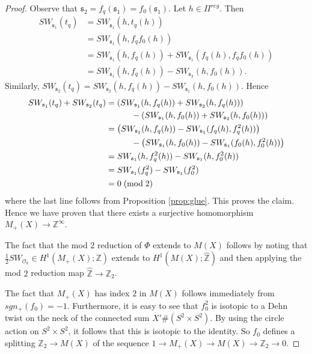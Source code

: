 \documentclass{amsart}
\theoremstyle{definition}
\theoremstyle{remark}
\numberwithin{equation}{section}
\begin{document}
\begin{proof}
Observe that $\mathfrak{s}_2 = f_q(\mathfrak{s}_1) = f_0(\mathfrak{s}_1)$. Let $h \in \Pi^{reg}$. Then
\begin{align*}
SW_{\mathfrak{s}_1}(t_q) &= SW_{\mathfrak{s}_1}( h , t_q(h) ) \\
&= SW_{\mathfrak{s}_1}(h , f_q f_0(h) ) \\
&= SW_{\mathfrak{s}_1}(h , f_q(h) ) + SW_{\mathfrak{s}_1}( f_q(h) , f_q f_0(h) ) \\
&= SW_{\mathfrak{s}_1}(h , f_q(h) ) - SW_{\mathfrak{s}_2}( h , f_0(h)).
\end{align*}
Similarly, $SW_{\mathfrak{s}_2}(t_q) = SW_{\mathfrak{s}_2}(h,f_q(h)) - SW_{\mathfrak{s}_1}(h,f_0(h))$. Hence
\begin{align*}
SW_{\mathfrak{s}_1}(t_q) + SW_{\mathfrak{s}_2}(t_q) &= \left( SW_{\mathfrak{s}_1}(h,f_q(h)) + SW_{\mathfrak{s}_2}(h,f_q(h)) \right) \\
& \quad \quad \quad - \left( SW_{\mathfrak{s}_1}(h,f_0(h)) + SW_{\mathfrak{s}_2}(h,f_0(h)) \right) \\
&= \left( SW_{\mathfrak{s}_1}(h,f_q(h)) - SW_{\mathfrak{s}_1}(f_q(h),f_q^2(h)) \right) \\ 
& \quad \quad \quad - \left( SW_{\mathfrak{s}_1}(h,f_0(h)) - SW_{\mathfrak{s}_1}(f_0(h),f_0^2(h)) \right) \\
&= SW_{\mathfrak{s}_1}( h , f_q^2(h) ) - SW_{\mathfrak{s}_1}( h , f_0^2(h) ) \\
&= SW_{\mathfrak{s}_1}( f_q^2 ) - SW_{\mathfrak{s}_1}( f_0^2 ) \\
&= 0 \; ({\rm mod} \; 2)
\end{align*}
where the last line follows from Proposition \ref{prop:glue}. This proves the claim. Hence we have proven that there exists a surjective homomorphism $M_+(X) \to \mathbb{Z}^\infty$.

The fact that the mod $2$ reduction of $\Phi$ extends to $M(X)$ follows by noting that $\frac{1}{2}SW_{\mathcal{O}_k} \in H^1( M_+(X) ; \mathbb{Z})$ extends to $H^1(M(X) ; \widehat{\mathbb{Z}})$ and then applying the mod $2$ reduction map $\widehat{\mathbb{Z}} \to \mathbb{Z}_2$.

The fact that $M_+(X)$ has index $2$ in $M(X)$ follows immediately from $sgn_+(f_0) = -1$. Furthermore, it is easy to see that $f_0^2$ is isotopic to a Dehn twist on the neck of the connected sum $X' \# (S^2 \times S^2)$. By using the circle action on $S^2 \times S^2$, it follows that this is isotopic to the identity. So $f_0$ defines a splitting $\mathbb{Z}_2 \to M(X)$ of the sequence $1 \to M_+(X) \to M(X) \to \mathbb{Z}_2 \to 0$.
\end{proof}
\end{document}
